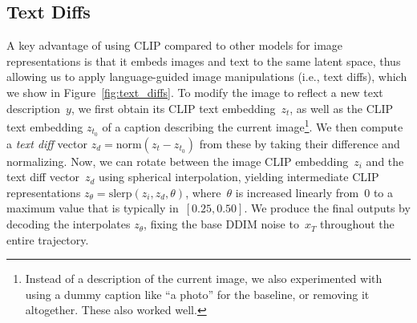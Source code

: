 \documentclass{article}
\begin{document}
\subsection{Text Diffs}
\label{sec:text_diffs}
A key advantage of using CLIP compared to other models for image representations is that it embeds images and text to the same latent space, thus allowing us to apply language-guided image manipulations (i.e., text diffs), which we show in Figure~\ref{fig:text_diffs}. To modify the image to reflect a new text description~$y$, we first obtain its CLIP text embedding~$z_t$, as well as the CLIP text embedding $z_{t_0}$ of a caption describing the current image\footnote{Instead of a description of the current image, we also experimented with using a dummy caption like ``a photo'' for the baseline, or removing it altogether. These also worked well.}. We then compute a \textit{text diff} vector $z_d = \text{norm}(z_t - z_{t_0})$ from these by taking their difference and normalizing. Now, we can rotate between the image CLIP embedding~$z_i$ and the text diff vector~$z_d$ using spherical interpolation, yielding intermediate CLIP representations $z_\theta = \text{slerp}(z_i, z_d, \theta)$, where~$\theta$ is increased linearly from~0 to a maximum value that is typically in~$[0.25, 0.50]$. We produce the final outputs by decoding the interpolates $z_\theta$, fixing the base DDIM noise to~$x_T$ throughout the entire trajectory.
\end{document}
